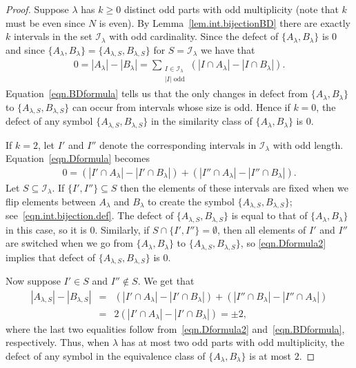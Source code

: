 \documentclass[reqno,11pt]{amsart}
\theoremstyle{remark}
\theoremstyle{remark}
\theoremstyle{definition}
\theoremstyle{definition}
\theoremstyle{definition}
\numberwithin{equation}{section}
\newcommand{\ci}{\mathcal{I}}
\begin{document}
\begin{proof}
Suppose $\lambda$ has $k\geq 0$ distinct odd parts with odd multiplicity (note that $k$ must be even since $N$ is even). By Lemma~\ref{lem.int.bijectionBD} there are exactly $k$ intervals in the set $\ci_\lambda$ with odd cardinality.  
Since the defect of $\{A_\lambda, B_\lambda\}$ is $0$ and since $\{A_\lambda, B_\lambda\} =\{A_{\lambda,S}, B_{\lambda,S}\}$ for $S=\ci_\lambda$ we have that
\begin{eqnarray}\label{eqn.Dformula}
0 =  |A_\lambda| - |B_\lambda|  =  \sum_{\substack{I\in \ci_\lambda \\ |I| \text{ odd}}} \left( |I\cap A_\lambda| - |I\cap B_\lambda| \right).
\end{eqnarray}
Equation~\eqref{eqn.BDformula} tells us that the only changes in defect from $\{A_\lambda, B_\lambda\}$ to $\{A_{\lambda, S}, B_{\lambda, S}\}$ can occur from intervals whose size is odd.  Hence if $k=0$, the defect of any symbol $\{A_{\lambda, S}, B_{\lambda, S}\}$ in the similarity class of $\{A_\lambda, B_\lambda\}$ is $0$.

If $k=2$, let $I'$ and $I''$ denote the corresponding intervals in $\ci_\lambda$ with odd length. Equation~\ref{eqn.Dformula} becomes
\begin{eqnarray}\label{eqn.Dformula2}
0= \left( |I'\cap A_\lambda| - |I' \cap B_\lambda| \right) +(|I''\cap A_\lambda| - |I''\cap B_\lambda|).
\end{eqnarray}
Let $S\subseteq \ci_\lambda$. If $\{I',I''\} \subseteq S$ then the elements of these intervals are fixed when we flip elements between $A_\lambda$ and $B_\lambda$ to create the symbol $\{A_{\lambda, S}, B_{\lambda, S}\}$; see~\eqref{eqn.int.bijection.def}. The defect of $\{A_{\lambda, S}, B_{\lambda, S}\}$ is equal to that of $\{A_\lambda, B_\lambda\}$ in this case, so it is $0$. Similarly, if $S\cap \{I',I''\} = \emptyset$, then all elements of $I'$ and $I''$ are switched when we
go from  $\{ A_\lambda, B_\lambda \}$ to $\{A_{\lambda, S}, B_{\lambda, S}\}$, so \eqref{eqn.Dformula2}
implies that defect of $\{A_{\lambda, S}, B_{\lambda, S}\}$ is $0$.

Now suppose $I' \in S$ and $I''\notin S$. We get that 
\begin{eqnarray*}
|A_{\lambda, S}| - |B_{\lambda, S}| &=& \left( |I' \cap A_\lambda| - |I'\cap B_\lambda| \right) + \left( |I''\cap B_\lambda| - |I'' \cap A_\lambda| \right) \\
&=& 2 \left(  |I' \cap A_\lambda| - |I'\cap B_\lambda|  \right) = \pm 2,
\end{eqnarray*}
where the last two equalities follow from~\eqref{eqn.Dformula2} and~\eqref{eqn.BDformula}, respectively. Thus, when $\lambda$ has at most two odd parts with odd multiplicity, the defect of any symbol in the equivalence class of $\{A_\lambda, B_\lambda\}$ is at most $2$. 


\end{proof}
\end{document}
